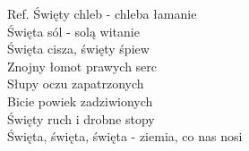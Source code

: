 \begin{flushleft}
\vskip 3mm
Ref. Święty chleb - chleba łamanie\\
\hspace{0.9cm}Święta sól - solą witanie \\
\hspace{0.9cm}Święta cisza, święty śpiew \\
\hspace{0.9cm}Znojny łomot prawych serc \\
\hspace{0.9cm}Słupy oczu zapatrzonych \\
\hspace{0.9cm}Bicie powiek zadziwionych \\
\hspace{0.9cm}Święty ruch i drobne stopy \\
\hspace{0.9cm}Święta, święta, święta - ziemia, co nas nosi \\
\end{flushleft}
\clearpage
